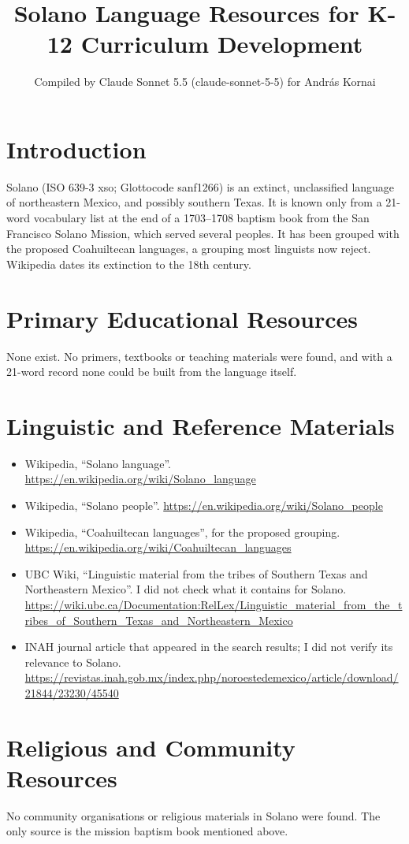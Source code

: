 \documentclass[12pt]{article}
\title{Solano Language Resources for K-12 Curriculum Development}
\author{Compiled by Claude Sonnet 5.5 (claude-sonnet-5-5) for Andr\'as Kornai}
\date{}
\begin{document}
\maketitle

\section{Introduction}
Solano (ISO 639-3 xso; Glottocode sanf1266) is an extinct, unclassified language of northeastern Mexico, and possibly southern Texas. It is known only from a 21-word vocabulary list at the end of a 1703--1708 baptism book from the San Francisco Solano Mission, which served several peoples. It has been grouped with the proposed Coahuiltecan languages, a grouping most linguists now reject. Wikipedia dates its extinction to the 18th century.

\section{Primary Educational Resources}
None exist. No primers, textbooks or teaching materials were found, and with a 21-word record none could be built from the language itself.

\section{Linguistic and Reference Materials}
\begin{itemize}
\item Wikipedia, ``Solano language''. \url{https://en.wikipedia.org/wiki/Solano_language}
\item Wikipedia, ``Solano people''. \url{https://en.wikipedia.org/wiki/Solano_people}
\item Wikipedia, ``Coahuiltecan languages'', for the proposed grouping. \url{https://en.wikipedia.org/wiki/Coahuiltecan_languages}
\item UBC Wiki, ``Linguistic material from the tribes of Southern Texas and Northeastern Mexico''. I did not check what it contains for Solano. \url{https://wiki.ubc.ca/Documentation:RelLex/Linguistic_material_from_the_tribes_of_Southern_Texas_and_Northeastern_Mexico}
\item INAH journal article that appeared in the search results; I did not verify its relevance to Solano. \url{https://revistas.inah.gob.mx/index.php/noroestedemexico/article/download/21844/23230/45540}
\end{itemize}

\section{Religious and Community Resources}
No community organisations or religious materials in Solano were found. The only source is the mission baptism book mentioned above.
\end{document}
